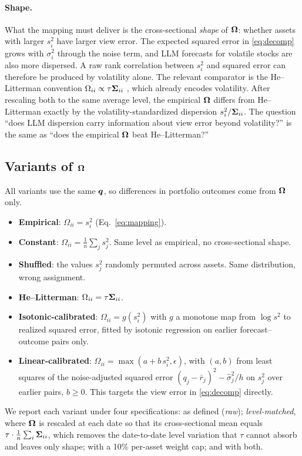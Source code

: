 \paragraph{Shape.} What the mapping must deliver is the cross-sectional \emph{shape} of $\bm{\Omega}$: whether assets with larger $s_i^2$ have larger view error. The expected squared error in \eqref{eq:decomp} grows with $\sigma_i^2$ through the noise term, and LLM forecasts for volatile stocks are also more dispersed. A raw rank correlation between $s_i^2$ and squared error can therefore be produced by volatility alone. The relevant comparator is the He--Litterman convention $\Omega_{ii} \propto \tau\bm{\Sigma}_{ii}$ \citep{he2002intuition}, which already encodes volatility. After rescaling both to the same average level, the empirical $\bm{\Omega}$ differs from He--Litterman exactly by the volatility-standardized dispersion $s_i^2/\bm{\Sigma}_{ii}$. The question ``does LLM dispersion carry information about view error beyond volatility?'' is the same as ``does the empirical $\bm{\Omega}$ beat He--Litterman?''

\subsection{Variants of \texorpdfstring{$\bm{\Omega}$}{Omega}}\label{sec:omega_variants}
All variants use the same $\bm{q}$, so differences in portfolio outcomes come from $\bm{\Omega}$ only.
\begin{itemize}
  \item \textbf{Empirical}: $\Omega_{ii} = s_i^2$ (Eq.~\ref{eq:mapping}).
  \item \textbf{Constant}: $\Omega_{ii} = \frac{1}{n}\sum_j s_j^2$. Same level as empirical, no cross-sectional shape.
  \item \textbf{Shuffled}: the values $s_j^2$ randomly permuted across assets. Same distribution, wrong assignment.
  \item \textbf{He--Litterman}: $\Omega_{ii} = \tau \bm{\Sigma}_{ii}$.
  \item \textbf{Isotonic-calibrated}: $\Omega_{ii} = g(s_i^2)$ with $g$ a monotone map from $\log s^2$ to realized squared error, fitted by isotonic regression on earlier forecast--outcome pairs only.
  \item \textbf{Linear-calibrated}: $\Omega_{ii} = \max(a + b\,s_i^2, \epsilon)$, with $(a,b)$ from least squares of the noise-adjusted squared error $(q_j-\bar r_j)^2 - \hat\sigma_j^2/h$ on $s_j^2$ over earlier pairs, $b\ge 0$. This targets the view error in \eqref{eq:decomp} directly.
\end{itemize}
We report each variant under four specifications: as defined (\emph{raw}); \emph{level-matched}, where $\bm{\Omega}$ is rescaled at each date so that its cross-sectional mean equals $\tau\cdot\frac{1}{n}\sum_i\bm{\Sigma}_{ii}$, which removes the date-to-date level variation that $\tau$ cannot absorb and leaves only shape; with a 10\% per-asset weight cap; and with both.

